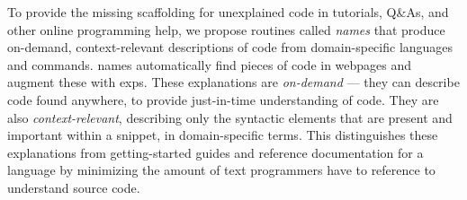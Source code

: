 \begin{figure}[!t]
\end{figure}

To provide the missing scaffolding for unexplained code in tutorials, Q\&As, and other online programming help, we propose routines called \emph{\Glspl{name}} that produce on-demand, context-relevant descriptions of code from domain-specific languages and commands.
\Glspl{name} automatically find pieces of code in webpages and augment these with \glspl{exp}.
These explanations are \emph{on-demand} --- they can describe code found anywhere, to provide just-in-time understanding of code.
They are also \emph{context-relevant}, describing only the syntactic elements that are present and important within a snippet, in domain-specific terms.
This distinguishes these explanations from getting-started guides and reference documentation for a language by minimizing the amount of text programmers have to reference to understand source code.

